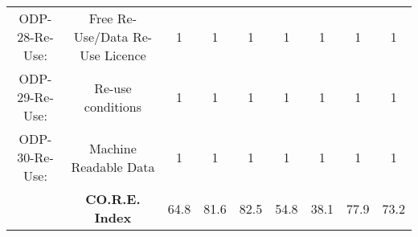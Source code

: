 \documentclass[a4paper, twoside]{report}
\begin{document}
\begin{table}[htbp]
\begin{adjustbox}{max width=\linewidth}
\begin{tabular}{rcccccccc}
    \multicolumn{1}{c}{ODP-28-Re-Use:} & \multicolumn{1}{p{19em}}{\cellcolor[rgb]{ .749,  .749,  .749}Free Re-Use/Data Re-Use Licence} & \cellcolor[rgb]{ .749,  .749,  .749}1 & \cellcolor[rgb]{ .749,  .749,  .749}1 & \cellcolor[rgb]{ .749,  .749,  .749}1 & \cellcolor[rgb]{ .749,  .749,  .749}1 & \cellcolor[rgb]{ .749,  .749,  .749}1 & \cellcolor[rgb]{ .749,  .749,  .749}1 & \cellcolor[rgb]{ .749,  .749,  .749}1 \\
    \multicolumn{1}{c}{ODP-29-Re-Use:} & \multicolumn{1}{p{19em}}{\cellcolor[rgb]{ .749,  .749,  .749}Re-use conditions} & \cellcolor[rgb]{ .749,  .749,  .749}1 & \cellcolor[rgb]{ .749,  .749,  .749}1 & \cellcolor[rgb]{ .749,  .749,  .749}1 & \cellcolor[rgb]{ .749,  .749,  .749}1 & \cellcolor[rgb]{ .749,  .749,  .749}1 & \cellcolor[rgb]{ .749,  .749,  .749}1 & \cellcolor[rgb]{ .749,  .749,  .749}1 \\
    \multicolumn{1}{c}{ODP-30-Re-Use:} & \multicolumn{1}{p{19em}}{\cellcolor[rgb]{ .749,  .749,  .749}Machine Readable Data} & \cellcolor[rgb]{ .749,  .749,  .749}1 & \cellcolor[rgb]{ .749,  .749,  .749}1 & \cellcolor[rgb]{ .749,  .749,  .749}1 & \cellcolor[rgb]{ .749,  .749,  .749}1 & \cellcolor[rgb]{ .749,  .749,  .749}1 & \cellcolor[rgb]{ .749,  .749,  .749}1 & \cellcolor[rgb]{ .749,  .749,  .749}1 \\
    \midrule
          & \textbf{CO.R.E. Index} & 64.8  & 81.6  & 82.5  & 54.8  & 38.1  & 77.9  & 73.2 \\
    \end{tabular}%
    \end{adjustbox}
  \label{tab:score_final1}%
\end{table}%

\end{document}

